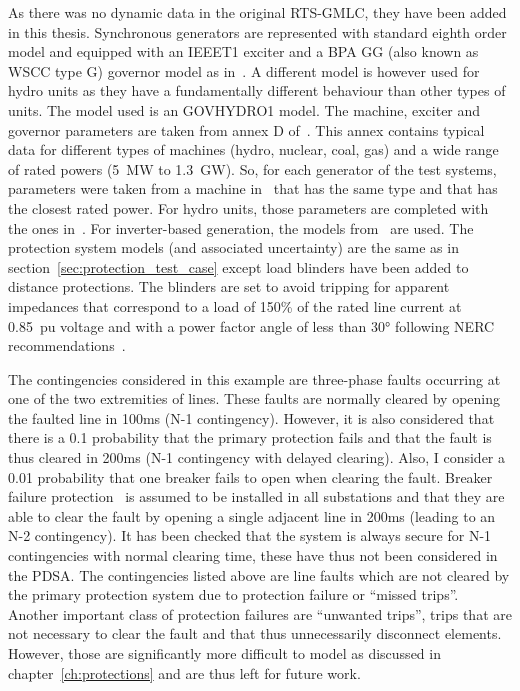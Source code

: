 As there was no dynamic data in the original RTS-GMLC, they have been added in this thesis. Synchronous generators are represented with standard eighth order model and equipped with an IEEET1 exciter and a BPA GG (also known as WSCC type G) governor model as in~\cite{IEEE39Dynamic}. A different model is however used for hydro units as they have a fundamentally different behaviour than other types of units. The model used is an GOVHYDRO1 model. The machine, exciter and governor parameters are taken from annex D of~\cite{vittalBook}. This annex contains typical data for different types of machines (hydro, nuclear, coal, gas) and a wide range of rated powers (5~MW to 1.3~GW). So, for each generator of the test systems, parameters were taken from a machine in~\cite{vittalBook} that has the same type and that has the closest rated power. For hydro units, those parameters are completed with the ones in~\cite{hydroGov}. For inverter-based generation, the models from~\cite{ChaspierreThesis} are used. The protection system models (and associated uncertainty) are the same as in section~\ref{sec:protection_test_case} except load blinders have been added to distance protections. The blinders are set to avoid tripping for apparent impedances that correspond to a load of 150\% of the rated line current at 0.85~pu voltage and with a power factor angle of less than 30° following NERC recommendations~\cite{NERC_load_blinders}.

The contingencies considered in this example are three-phase faults occurring at one of the two extremities of lines. These faults are normally cleared by opening the faulted line in 100ms (N-1 contingency). However, it is also considered that there is a 0.1 probability that the primary protection fails and that the fault is thus cleared in 200ms (N-1 contingency with delayed clearing). Also, I consider a 0.01 probability that one breaker fails to open when clearing the fault. Breaker failure protection~\cite{HorowitzBook} is assumed to be installed in all substations and that they are able to clear the fault by opening a single adjacent line in 200ms (leading to an N-2 contingency). It has been checked that the system is always secure for N-1 contingencies with normal clearing time, these have thus not been considered in the PDSA. The contingencies listed above are line faults which are not cleared by the primary protection system due to protection failure or ``missed trips''. Another important class of protection failures are ``unwanted trips'', \ie trips that are not necessary to clear the fault and that thus unnecessarily disconnect elements. However, those are significantly more difficult to model as discussed in chapter~\ref{ch:protections} and are thus left for future work.

